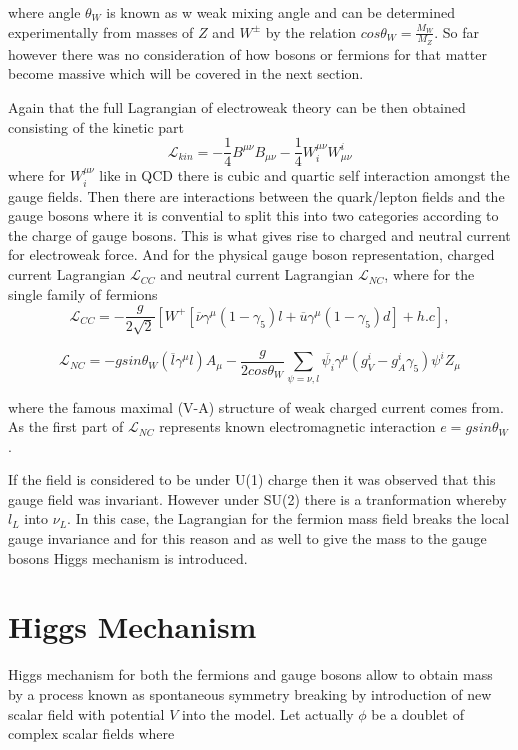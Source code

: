 where angle $\theta_{W}$ is known as w weak mixing angle and can be determined experimentally from masses of $Z$ and $W^{\pm}$ by the relation
$cos\theta_{W} = \frac{M_{W}}{M_{Z}}$. So far however there was no consideration of how bosons or fermions for that matter become massive which will be covered in the next section.

Again that the full Lagrangian of electroweak theory can be then obtained consisting of the kinetic part
\begin{equation}
\mathcal{L}_{kin}=  -\frac{1}{4} B^{\mu\nu}B_{\mu\nu} -\frac{1}{4} W_{i}^{\mu\nu}W^{i}_{\mu\nu}
\end{equation}
where for $W_{i}^{\mu\nu}$ like in QCD there is cubic and quartic self interaction amongst the gauge fields. Then there are interactions between the quark/lepton fields and the gauge bosons where it is convential to split this into two categories according to the charge of gauge bosons.
This is what gives rise to charged and neutral current for electroweak force. And for the physical gauge boson representation, charged current Lagrangian $\mathcal{L}_{CC}$ and neutral current Lagrangian $\mathcal{L}_{NC}$, where for the single family of fermions
\begin{equation}
	\mathcal{L}_{CC}= - \frac{g}{2\sqrt{2}}[W^{+}[\overline{\nu}\gamma^{\mu}(1-\gamma_{5})l + \overline{u}\gamma^{\mu}(1-\gamma_{5})d] + h.c], 
\end{equation}

\begin{equation}
	\mathcal{L}_{NC}= - g sin\theta_{W}(\overline{l}\gamma^{\mu}l)A_{\mu} - \frac{g}{2cos\theta_{W}}\sum_{\psi=\nu,l} \overline{\psi_{i}}\gamma^{\mu}(g^{i}_{V} - g^{i}_{A}\gamma_{5})\psi^{i}Z_{\mu}
\end{equation}


where the famous maximal (V-A) structure of weak charged current comes from. As the first part of $\mathcal{L}_{NC}$ represents known electromagnetic interaction $e=gsin\theta_{W}$. 

If the field is considered to be under U(1) charge then it was observed that this gauge field was invariant. However under SU(2) there is a tranformation whereby $l_{L}$ into $\nu_{L}$. In this case, the Lagrangian for the fermion mass field breaks the local gauge invariance and for this reason and as well to give the mass to the gauge bosons Higgs mechanism is introduced.

\section{Higgs Mechanism}
Higgs mechanism for both the fermions and gauge bosons allow to obtain mass by a process known as spontaneous symmetry breaking by introduction of new scalar field with potential $V$ into the model. Let actually $\phi$ be a doublet of complex scalar fields where

